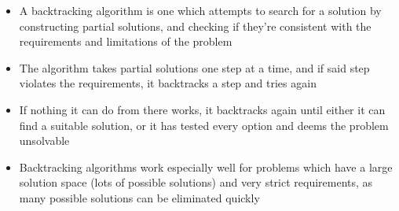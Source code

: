 \begin{itemize}
  \item A backtracking algorithm is one which attempts to search for a solution by constructing partial solutions, and checking if they're consistent with the requirements and limitations of the problem
  \item The algorithm takes partial solutions one step at a time, and if said step violates the requirements, it backtracks a step and tries again
  \item If nothing it can do from there works, it backtracks again until either it can find a suitable solution, or it has tested every option and deems the problem unsolvable
  \item Backtracking algorithms work especially well for problems which have a large solution space (lots of possible solutions) and very strict requirements, as many possible solutions can be eliminated quickly
\end{itemize}